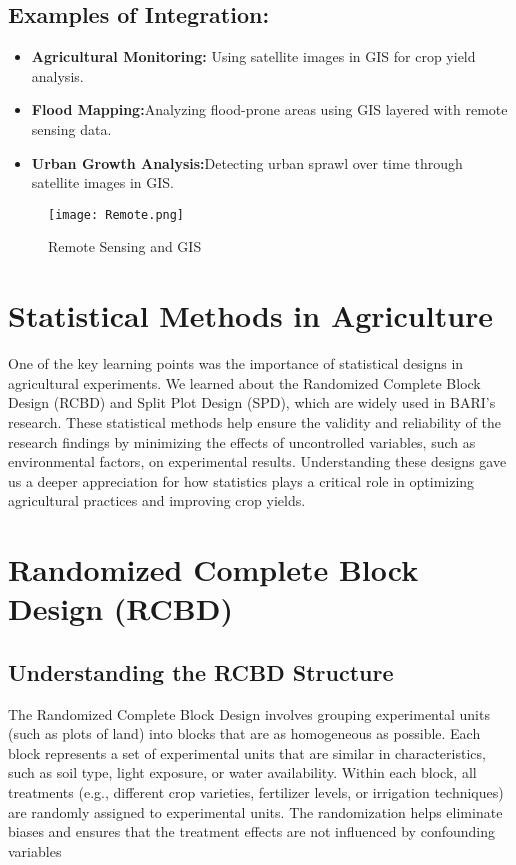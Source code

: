 \documentclass[oneside,12pt,fleqn]{book}
\begin{document}
\subsection*{Examples of Integration:}
\begin{itemize}
    \item \textbf{Agricultural Monitoring: }Using satellite images in GIS for crop yield analysis.
    \item \textbf{Flood Mapping:}Analyzing flood-prone areas using GIS layered with remote sensing data.
    \item \textbf{Urban Growth Analysis:}Detecting urban sprawl over time through satellite images in GIS.
\end{itemize}

\begin{figure}[h!]
    \centering
    \texttt{[image: Remote.png]} %
    \caption{Remote Sensing and GIS}
    \label{fig:sample} %
\end{figure}
\section{Statistical Methods in Agriculture}
One of the key learning points was the importance of statistical designs in agricultural experiments. We learned about the Randomized Complete Block Design (RCBD) and Split Plot Design (SPD), which are widely used in BARI’s research. These statistical methods help ensure the validity and reliability of the research findings by minimizing the effects of uncontrolled variables, such as environmental factors, on experimental results. Understanding these designs gave us a deeper appreciation for how statistics plays a critical role in optimizing agricultural practices and improving crop yields.
\section{Randomized Complete Block Design (RCBD)}
\subsection{Understanding the RCBD Structure}
The Randomized Complete Block Design involves grouping experimental units (such as plots of land) into blocks that are as homogeneous as possible. Each block represents a set of experimental units that are similar in characteristics, such as soil type, light exposure, or water availability. Within each block, all treatments (e.g., different crop varieties, fertilizer levels, or irrigation techniques) are randomly assigned to experimental units. The randomization helps eliminate biases and ensures that the treatment effects are not influenced by confounding variables
\end{document}
